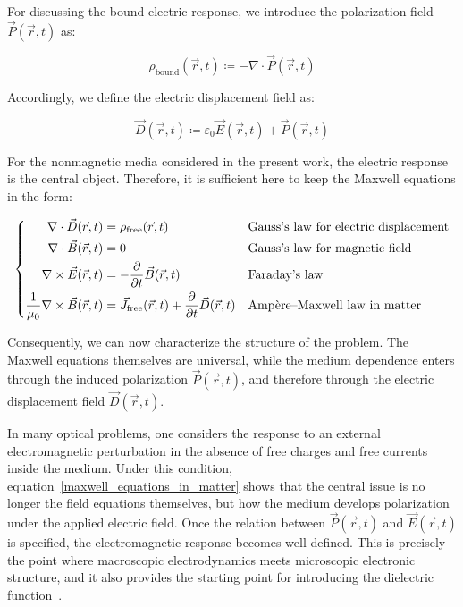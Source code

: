 For discussing the bound electric response, we introduce the polarization field $\vec{P}(\vec{r},t)$ as:

\begin{equation}
    \rho_\mathrm{bound}(\vec{r},t)\coloneqq -\nabla\cdot\vec{P}(\vec{r},t)
\label{bound_charge_from_polarization}
\end{equation}

Accordingly, we define the electric displacement field as:

\begin{equation}
    \vec{D}(\vec{r},t)\coloneqq \varepsilon_0\vec{E}(\vec{r},t)+\vec{P}(\vec{r},t)
\label{electric_displacement_field_definition}
\end{equation}

For the nonmagnetic media considered in the present work, the electric response is the central object.
Therefore, it is sufficient here to keep the Maxwell equations in the form:

\begin{equation}
\left\{\begin{aligned}
    \nabla\cdot\vec{D}(\vec{r},t) &= \rho_\mathrm{free}(\vec{r},t) 
    &&\space \text{Gauss's law for electric displacement} \\
    \nabla\cdot\vec{B}(\vec{r},t) &= 0 
    &&\space \text{Gauss's law for magnetic field} \\
    \nabla\times\vec{E}(\vec{r},t) &= -\frac{\partial}{\partial t}\vec{B}(\vec{r},t) 
    &&\space \text{Faraday's law} \\
    \frac{1}{\mu_0}\nabla\times\vec{B}(\vec{r},t) &= \vec{J}_\mathrm{free}(\vec{r},t)+\frac{\partial}{\partial t}\vec{D}(\vec{r},t)
    &&\space \text{Amp\`ere--Maxwell law in matter}
\end{aligned}\right.
\label{maxwell_equations_in_matter}
\end{equation}

Consequently, we can now characterize the structure of the problem.
The Maxwell equations themselves are universal,
while the medium dependence enters through the induced polarization $\vec{P}(\vec{r},t)$, and therefore through the electric displacement field $\vec{D}(\vec{r},t)$.

In many optical problems, one considers the response to an external electromagnetic perturbation in the absence of free charges and free currents inside the medium.
Under this condition, equation~\eqref{maxwell_equations_in_matter} shows that the central issue is no longer the field equations themselves,
but how the medium develops polarization under the applied electric field.
Once the relation between $\vec{P}(\vec{r},t)$ and $\vec{E}(\vec{r},t)$ is specified, the electromagnetic response becomes well defined.
This is precisely the point where macroscopic electrodynamics meets microscopic electronic structure,
and it also provides the starting point for introducing the dielectric function~\cite{landau2013electrodynamics,lima2022usefulness,bernasconi2011first}.

